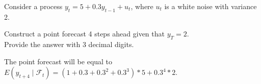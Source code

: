 
\begin{question}
Consider a process \(y_t = 5 + 0.3 y_{t-1}+u_t\), where \(u_t\) is a white noise with variance 2.

Construct a point forecast 4 steps ahead given that \(y_T=2\).\\
Provide the answer with 3 decimal digits.
\end{question}

\begin{solution}
The point forecast will be equal to \(E(y_{t+4}\mid \mathcal{F}_t) = (1 + 0.3 + 0.3^2 + 0.3^3)*5+0.3^4*2\).
\end{solution}

